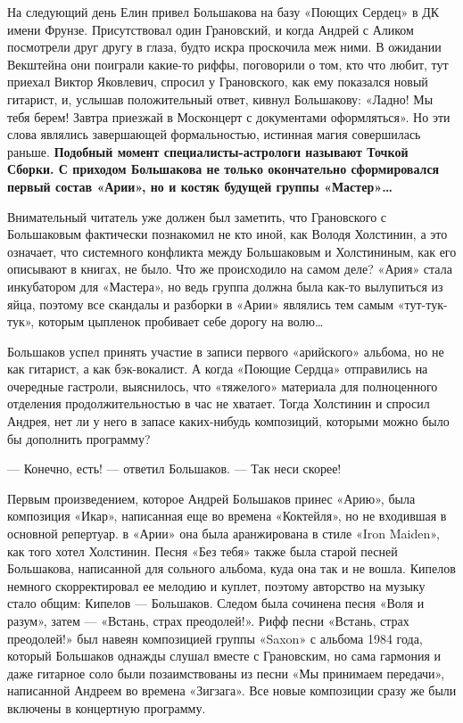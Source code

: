 \documentclass[16pt,a5paper,oneside]{book}
\begin{document}
На следующий день Елин привел Большакова на базу «Поющих Сердец» в ДК имени Фрунзе. Присутствовал один Грановский, и
когда Андрей с Аликом посмотрели друг другу в глаза, будто искра проскочила меж ними. В ожидании Векштейна они поиграли
какие-то риффы, поговорили о том, кто что любит, тут приехал Виктор Яковлевич, спросил у Грановского, как ему показался
новый гитарист, и, услышав положительный ответ, кивнул Большакову: «Ладно! Мы тебя берем! Завтра приезжай в Москонцерт с
документами оформляться». Но эти слова являлись завершающей формальностью, истинная магия совершилась раньше.
\textbf{Подобный момент специалисты-астрологи называют Точкой Сборки. С приходом Большакова не только окончательно
сформировался первый состав «Арии», но и костяк будущей группы «Мастер»\ldots}

Внимательный читатель уже должен был заметить, что Грановского с Большаковым фактически познакомил не кто иной, как
Володя Холстинин, а это означает, что системного конфликта между Большаковым и Холстининым, как его описывают в книгах,
не было. Что же происходило на самом деле? «Ария» стала инкубатором для «Мастера», но ведь группа должна была как-то
вылупиться из яйца, поэтому все скандалы и разборки в «Арии» являлись тем самым «тут-тук-тук», которым цыпленок
пробивает себе дорогу на волю\ldots

Большаков успел принять участие в записи первого «арийского» альбома, но не как гитарист, а как бэк-вокалист. А когда
«Поющие Сердца» отправились на очередные гастроли, выяснилось, что «тяжелого» материала для полноценного отделения
продолжительностью в час не хватает. Тогда Холстинин и спросил Андрея, нет ли у него в запасе каких-нибудь композиций,
которыми можно было бы дополнить программу?

— Конечно, есть! — ответил Большаков.
— Так неси скорее!

Первым произведением, которое Андрей Большаков принес «Арию», была композиция «Икар», написанная еще во времена
«Коктейля», но не входившая в основной репертуар. в «Арии» она была аранжирована в стиле «Iron Maiden», как того хотел
Холстинин. Песня «Без тебя» также была старой песней Большакова, написанной для сольного альбома, куда она так и не
вошла. Кипелов немного скорректировал ее мелодию и куплет, поэтому авторство на музыку стало общим: Кипелов — Большаков.
Следом была сочинена песня «Воля и разум», затем — «Встань, страх преодолей!». Рифф песни «Встань, страх преодолей!» был
навеян композицией группы «Saxon» с альбома 1984 года, который Большаков однажды слушал вместе с Грановским, но сама
гармония и даже гитарное соло были позаимствованы из песни «Мы принимаем передачи», написанной Андреем во времена
«Зигзага». Все новые композиции сразу же были включены в концертную программу.
\end{document}
